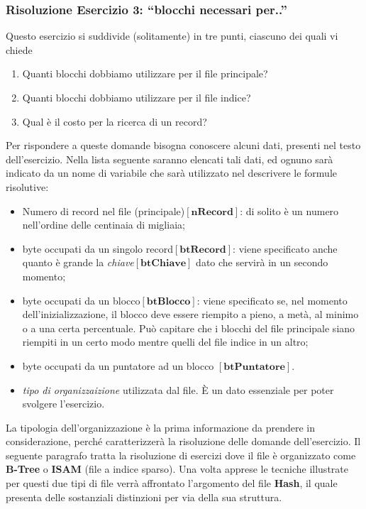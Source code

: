 \subsubsection{Risoluzione Esercizio 3: ``blocchi necessari per..''}
Questo esercizio si suddivide (solitamente) in tre punti, ciascuno dei quali vi chiede
\begin{enumerate}
\item Quanti blocchi dobbiamo utilizzare per il file principale? 
\item Quanti blocchi dobbiamo utilizzare per il file indice?
\item Qual è il costo per la ricerca di un record? 
\end{enumerate}

Per rispondere a queste domande bisogna conoscere alcuni dati, presenti nel testo dell'esercizio. Nella lista 
seguente saranno elencati tali dati, ed ognuno sarà indicato da un nome di variabile che sarà utilizzato nel 
descrivere le formule risolutive:

\begin{itemize}
 \item Numero di record nel file (principale)$[\mathbf{nRecord}]$: di solito è un numero nell'ordine delle centinaia 
 di migliaia;
 \item byte occupati da un singolo record$[\mathbf{btRecord}]$: viene specificato anche quanto è grande la \emph{chiave}$[\mathbf{btChiave}]$
 dato che servirà in un secondo momento;
 \item byte occupati da un blocco$[\mathbf{btBlocco}]$: viene specificato se, nel momento dell'inizializzazione, 
 il blocco deve essere riempito a pieno, a metà, al minimo o a una certa percentuale. Può capitare
 che i blocchi del file principale siano riempiti in un certo modo mentre quelli del file indice in 
 un altro;
 \item byte occupati da un puntatore ad un blocco $[\mathbf{btPuntatore}]$.
 \item \emph{tipo di organizzaizione} utilizzata dal file. \`E un dato essenziale per poter svolgere
 l'esercizio.
\end{itemize}
La tipologia dell'organizzazione è la prima informazione da prendere in considerazione, perché caratterizzerà
la risoluzione delle domande dell'esercizio. Il seguente paragrafo tratta la risoluzione di esercizi dove il file
è organizzato come \textbf{B-Tree} o \textbf{ISAM} (file a indice sparso). Una volta apprese le tecniche illustrate
per questi due tipi di file verrà affrontato l'argomento del file \textbf{Hash}, il quale presenta delle sostanziali
distinzioni per via della sua struttura.\\

